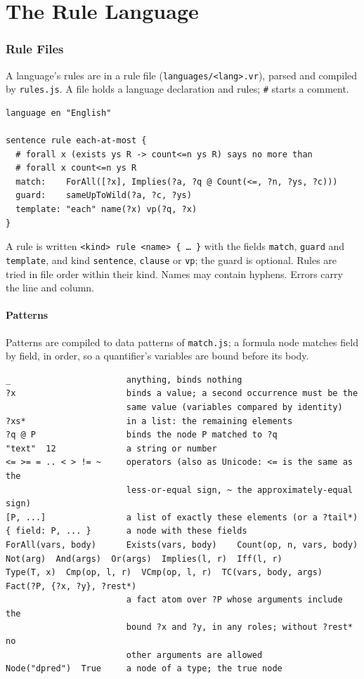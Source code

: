 \documentclass[11pt, a4paper]{article}
\newcommand{\code}[1]{\texttt{\color{codefg}#1}}
\begin{document}
\part{The Rule Language}
\label{part:dsl}

\section{Rule Files}
\label{sec:syntax}

A language's rules are in a rule file (\code{languages/<lang>.vr}), parsed
and compiled by \code{rules.js}. A file holds a language declaration and
rules; \code{\#} starts a comment.

\begin{lstlisting}
language en "English"

sentence rule each-at-most {
  # forall x (exists ys R -> count<=n ys R) says no more than
  # forall x count<=n ys R
  match:    ForAll([?x], Implies(?a, ?q @ Count(<=, ?n, ?ys, ?c)))
  guard:    sameUpToWild(?a, ?c, ?ys)
  template: "each" name(?x) vp(?q, ?x)
}
\end{lstlisting}

A rule is written \code{<kind> rule <name> \{ \ldots\ \}} with the fields \code{match}, \code{guard} and \code{template}, and kind \code{sentence}, \code{clause} or
\code{vp}; the guard is optional. Rules are tried in file order within their
kind. Names may contain hyphens. Errors carry the line and column.

\subsection{Patterns}

Patterns are compiled to data patterns of \code{match.js}; a formula node
matches field by field, in order, so a quantifier's variables are bound
before its body.

\begin{lstlisting}
_                       anything, binds nothing
?x                      binds a value; a second occurrence must be the
                        same value (variables compared by identity)
?xs*                    in a list: the remaining elements
?q @ P                  binds the node P matched to ?q
"text"  12              a string or number
<= >= = .. < > != ~     operators (also as Unicode: <= is the same as the
                        less-or-equal sign, ~ the approximately-equal sign)
[P, ...]                a list of exactly these elements (or a ?tail*)
{ field: P, ... }       a node with these fields
ForAll(vars, body)      Exists(vars, body)    Count(op, n, vars, body)
Not(arg)  And(args)  Or(args)  Implies(l, r)  Iff(l, r)
Type(T, x)  Cmp(op, l, r)  VCmp(op, l, r)  TC(vars, body, args)
Fact(?P, {?x, ?y}, ?rest*)
                        a fact atom over ?P whose arguments include the
                        bound ?x and ?y, in any roles; without ?rest* no
                        other arguments are allowed
Node("dpred")  True     a node of a type; the true node
\end{lstlisting}
\end{document}
